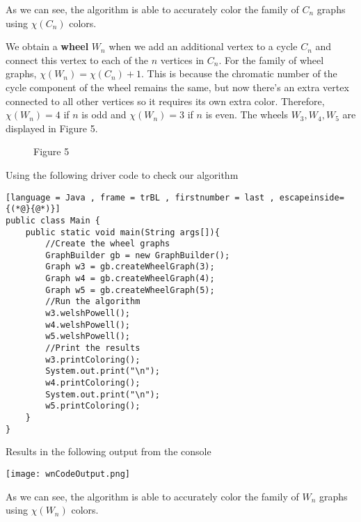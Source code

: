 \documentclass[12pt, letterpaper]{article}
\begin{document}
As we can see, the algorithm is able to accurately color the family of $C_n$ graphs using $\chi(C_n)$ colors.


We obtain a \textbf{wheel} $W_n$ when we add an additional vertex to a cycle $C_n$ and connect this vertex to each of the $n$ vertices in $C_n$. For the family of wheel graphs, $\chi(W_n)=\chi(C_n)+1$. This is because the chromatic number of the cycle component of the wheel remains the same, but now there's an extra vertex connected to all other vertices so it requires its own extra color. Therefore, $\chi(W_n)=4$ if $n$ is odd and $\chi(W_n)=3$ if $n$ is even. The wheels $W_3,W_4,W_5$ are displayed in Figure 5.


\begin{figure}[h!]%
\begin{center}
	\qquad
	\qquad
	\caption*{Figure 5}
\end{center}
\end{figure}


Using the following driver code to check our algorithm


\begin{lstlisting}[language = Java , frame = trBL , firstnumber = last , escapeinside={(*@}{@*)}]
public class Main {
    public static void main(String args[]){
        //Create the wheel graphs
        GraphBuilder gb = new GraphBuilder();
        Graph w3 = gb.createWheelGraph(3);
        Graph w4 = gb.createWheelGraph(4);
        Graph w5 = gb.createWheelGraph(5);
        //Run the algorithm
        w3.welshPowell();
        w4.welshPowell();
        w5.welshPowell();
        //Print the results
        w3.printColoring();
        System.out.print("\n");
        w4.printColoring();
        System.out.print("\n");
        w5.printColoring();
    }
}
\end{lstlisting}


Results in the following output from the console


\begin{center}
\texttt{[image: wnCodeOutput.png]}
\end{center}


As we can see, the algorithm is able to accurately color the family of $W_n$ graphs using $\chi(W_n)$ colors.
\end{document}

